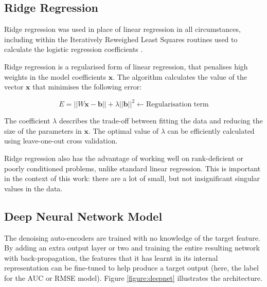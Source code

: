 \documentclass{article}
\begin{document}
\subsection{Ridge Regression}

Ridge regression was used in place of linear regression in all circumstances, including within the Iteratively Reweighed Least Squares routines used to calculate the logistic regression coefficients \cite{komarek2005}.

Ridge regression is a regularised form of linear regression, that penalises high weights in the model coefficients $\mathbf{x}$.  The algorithm calculates the value of the vector $\mathbf{x}$ that minimises the following error:

\begin{equation}
  E = ||W\mathbf{x} - \mathbf{b}|| + \lambda ||\mathbf{b}||^2 \leftarrow \mbox{Regularisation term}
\end{equation}

The coefficient $\lambda$ describes the trade-off between fitting the data and reducing the size of the parameters in $\mathbf{x}$.  The optimal value of $\lambda$ can be efficiently calculated using leave-one-out cross validation.

Ridge regression also has the advantage of working well on rank-deficient or poorly conditioned problems, unlike standard linear regression.  
This is important in the context of this work: there are a lot of small, but not insignificant singular values in the data. 

\subsection{Deep Neural Network Model}

The denoising auto-encoders are trained with no knowledge of the target feature.
By adding an extra output layer or two and training the entire resulting network with back-propagation, the features that it has learnt in its internal representation can be fine-tuned to help produce a target output (here, the label for the AUC or RMSE model).  Figure \ref{figure:deepnet} illustrates the architecture.
\end{document}

